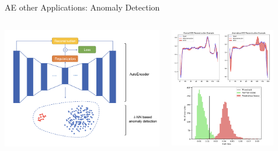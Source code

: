 \documentclass[serif, aspectratio=169]{beamer}
\begin{document}
\begin{frame}{AE other Applications: Anomaly Detection}
    \begin{columns}
        \begin{column}{0.5\textwidth}
            \begin{center}
                \includegraphics[width=\textwidth]{pic/AE other app anomaly detection1.png}
            \end{center}
        \end{column}

        \begin{column}{0.5\textwidth}
            \begin{center}
                \includegraphics[width=0.8\textwidth]{pic/AE other app anomaly detection2 .png}
            \end{center}
        \end{column}
    \end{columns}
\end{frame}
\end{document}
